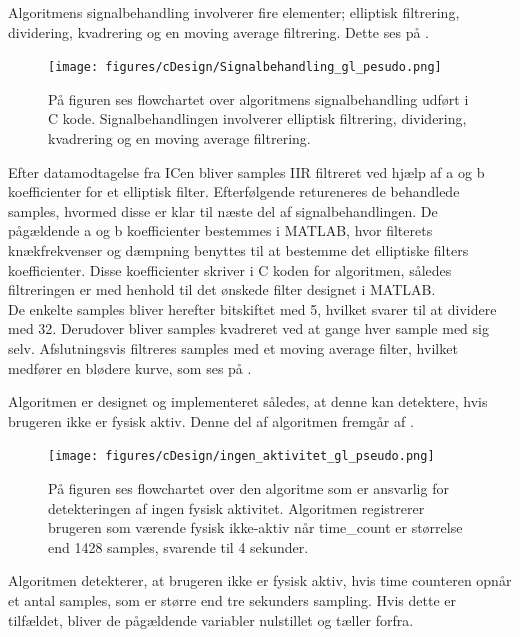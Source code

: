 Algoritmens signalbehandling involverer fire elementer; elliptisk filtrering, dividering, kvadrering og en moving average filtrering. Dette ses på .
\begin{figure}[H]
	\centering
	\texttt{[image: figures/cDesign/Signalbehandling\_gl\_pesudo.png]}
	\caption{På figuren ses flowchartet over algoritmens signalbehandling udført i C kode. Signalbehandlingen involverer elliptisk filtrering, dividering, kvadrering og en moving average filtrering.}
	\label{fig:signalbehandling_g_l}
\end{figure} \vspace{-0.5cm}
Efter datamodtagelse fra ICen bliver samples IIR filtreret ved hjælp af a og b koefficienter for et elliptisk filter. Efterfølgende retureneres de behandlede samples, hvormed disse er klar til næste del af signalbehandlingen. De pågældende a og b koefficienter bestemmes i MATLAB, hvor filterets knækfrekvenser og dæmpning benyttes til at bestemme det elliptiske filters koefficienter. Disse koefficienter skriver i C koden for algoritmen, således filtreringen er med henhold til det ønskede filter designet i MATLAB.\\
De enkelte samples bliver herefter bitskiftet med 5, hvilket svarer til at dividere med 32. Derudover bliver samples kvadreret ved at gange hver sample med sig selv. Afslutningsvis filtreres samples med et moving average filter, hvilket medfører en blødere kurve, som ses på .

Algoritmen er designet og implementeret således, at denne kan detektere, hvis brugeren ikke er fysisk aktiv. Denne del af algoritmen fremgår af .
\begin{figure}[H]
	\centering
	\texttt{[image: figures/cDesign/ingen\_aktivitet\_gl\_pseudo.png]}
	\caption{På figuren ses flowchartet over den algoritme som er ansvarlig for detekteringen af ingen fysisk aktivitet. Algoritmen registrerer brugeren som værende fysisk ikke-aktiv når time_count er størrelse end 1428 samples, svarende til 4 sekunder.}
	\label{fig:ingen_ak_pseudo}
\end{figure} \vspace{-0.5cm}
Algoritmen detekterer, at brugeren ikke er fysisk aktiv, hvis time counteren opnår et antal samples, som er større end tre sekunders sampling. Hvis dette er tilfældet, bliver de pågældende variabler nulstillet og tæller forfra.

